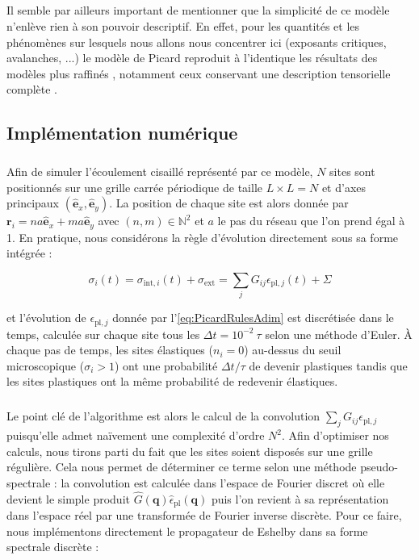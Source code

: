 \subparagraph{}Il semble par ailleurs important de mentionner que la simplicité de ce modèle n'enlève rien à son pouvoir descriptif. En effet, pour les quantités et les phénomènes sur lesquels nous allons nous concentrer ici (exposants critiques, avalanches, ...) le modèle de Picard reproduit à l'identique les résultats des modèles plus raffinés \cite{ferrero_criticality_2019}, notamment ceux conservant une description tensorielle complète \cite{nicolas_deformation_2018, budrikis_universal_2017}.

\subsection{Implémentation numérique}

\subparagraph{}Afin de simuler l'écoulement cisaillé représenté par ce modèle, $N$ sites sont positionnés sur une grille carrée périodique de taille $L\times L = N$ et d'axes principaux $(\hat{\mathbf{e}}_x, \hat{\mathbf{e}}_y)$. La position de chaque site est alors donnée par $\mathbf{r}_i = na\hat{\mathbf{e}}_x + ma \hat{\mathbf{e}}_y$ avec $(n,m) \in \mathbb{N}^2$ et $a$ le pas du réseau que l'on prend égal à 1. En pratique, nous considérons la règle d'évolution directement sous sa forme intégrée :

\begin{equation}
	\sigma_i(t) = \sigma_{\text{int},i}(t)+\sigma_\text{ext} =  \sum_{j}G_{ij}\epsilon_{\text{pl},j}(t)+\Sigma
	\label{eq:DynPicardInteg}
\end{equation}

\noindent et l'évolution de $\epsilon_{\text{pl},j}$ donnée par l'\autoref{eq:PicardRulesAdim} est discrétisée dans le temps, calculée sur chaque site tous les $\Delta t = 10^{-2}~\tau$ selon une méthode d'Euler. \`A chaque pas de temps, les sites élastiques ($n_i=0$) au-dessus du seuil microscopique ($\sigma_i >1$) ont une probabilité $\Delta t / \tau$ de devenir plastiques tandis que les sites plastiques ont la même probabilité de redevenir élastiques.

\subparagraph{}Le point clé de l'algorithme est alors le calcul de la convolution $\sum_{j}G_{ij}\epsilon_{\text{pl},j}$ puisqu'elle admet naïvement une complexité d'ordre $N^2$. Afin d'optimiser nos calculs, nous tirons parti du fait que les sites soient disposés sur une grille régulière. Cela nous permet de déterminer ce terme selon une méthode pseudo-spectrale : la convolution est calculée dans l'espace de Fourier discret où elle devient le simple produit $\hat{G}(\mathbf{q})\hat{\epsilon}_{\text{pl}}(\mathbf{q})$ puis l'on revient à sa représentation dans l'espace réel par une transformée de Fourier inverse discrète. Pour ce faire, nous implémentons directement le propagateur de Eshelby dans sa forme spectrale discrète \cite{picard_elastic_2004} :

